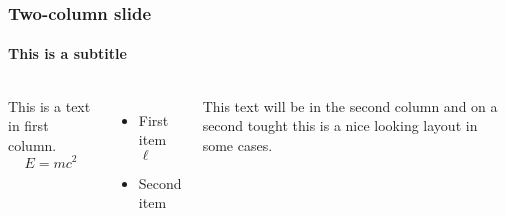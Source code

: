 \documentclass[11pt]{../formats/RU}
\begin{document}
\begin{frame}
\frametitle{Two-column slide}
\framesubtitle{This is a subtitle}

\begin{columns}

This is a text in first column.
$$E=mc^2$$
\begin{itemize}
\item First item $\ell$
\item Second item
\end{itemize}

This text will be in the second column
and on a second tought this is a nice looking
layout in some cases.
\end{columns}
\end{frame}
\end{document}
